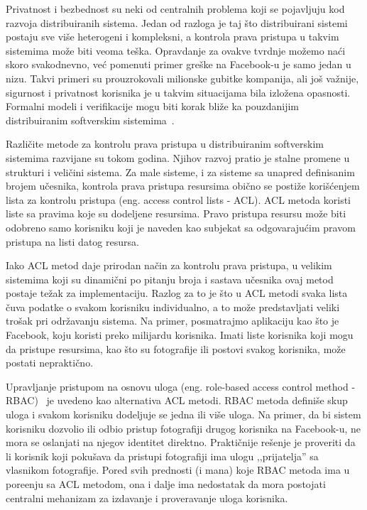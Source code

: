 Privatnost i bezbednost su neki od centralnih problema koji se pojavljuju kod razvoja distribuiranih sistema. Jedan od razloga je taj \v sto distribuirani sistemi postaju sve vi\v se heterogeni i kompleksni, a kontrola prava pristupa u takvim sistemima mo\v ze biti veoma te\v ska. Opravdanje za ovakve tvrdnje mo\v zemo na\' ci skoro svakodnevno, ve\' c pomenuti primer gre\v ske na Facebook-u je samo jedan u nizu. Takvi primeri su prouzrokovali milionske gubitke kompanija, ali jo\v s va\v znije, sigurnost i privatnost korisnika je u takvim situacijama bila izlo\v zena opasnosti. Formalni modeli i verifikacije mogu biti korak bli\v ze ka pouzdanijim distribuiranim softverskim sistemima~\cite{DBLP:journals/jlp/BugliesiCF17}.

%
Razli\v cite metode za kontrolu prava pristupa u distribuiranim softverskim sistemima razvijane su tokom godina. Njihov razvoj pratio je stalne promene u strukturi i veli\v cini sistema.
Za male sisteme, i za sisteme sa unapred definisanim brojem u\v cesnika, kontrola prava pristupa resursima obi\v cno se posti\v ze kori\v s\' cenjem lista za kontrolu pristupa (eng. access control lists - ACL). 
ACL metoda koristi liste sa pravima koje su dodeljene resursima. Pravo pristupa resursu mo\v ze biti odobreno samo korisniku koji je naveden kao subjekat sa odgovaraju\' cim pravom pristupa na listi datog resursa.

Iako ACL metod daje prirodan na\v cin za kontrolu prava pristupa, u velikim sistemima koji su dinami\v cni po pitanju broja i sastava u\v cesnika ovaj metod postaje te\v zak za implementaciju. Razlog za to je \v sto u ACL metodi svaka lista \v cuva podatke o svakom korisniku individualno, a to mo\v ze predstavljati veliki tro\v sak pri odr\v zavanju sistema. Na primer, posmatrajmo aplikaciju kao \v sto je Facebook, koju koristi preko milijardu korisnika. Imati liste korisnika koji mogu da pristupe resursima, kao \v sto su fotografije ili postovi svakog korisnika, mo\v ze postati neprakti\v cno. 

Upravljanje pristupom na osnovu uloga (eng. role-based access control method - RBAC)~\cite{sandhu1996role} 
je uvedeno kao alternativa ACL metodi.
RBAC metoda defini\v se skup uloga i svakom korisniku dodeljuje se jedna ili vi\v se uloga. Na primer, da bi sistem korisniku dozvolio ili odbio pristup fotografiji drugog korisnika na Facebook-u, ne mora se oslanjati na njegov identitet direktno. Prakti\v cnije re\v senje je proveriti da li korisnik koji poku\v sava da pristupi fotografiji ima ulogu ,,prijatelja'' sa vlasnikom fotografije.  
Pored svih prednosti (i mana) koje RBAC metoda ima u pore\dj enju sa ACL metodom, ona i dalje ima nedostatak da mora postojati centralni mehanizam za izdavanje i proveravanje uloga korisnika.


